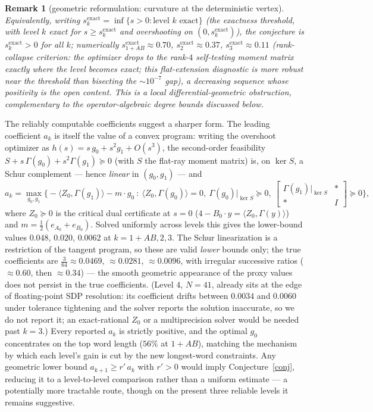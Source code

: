 \documentclass[11pt]{article}
\newtheorem{remark}[theorem]{Remark}
\begin{document}
\begin{remark}[geometric reformulation: curvature at the deterministic vertex]
Equivalently, writing
$s^{\mathrm{exact}}_k=\inf\{s>0:\text{level }k\text{ exact}\}$
(the exactness threshold, with level $k$ exact for
$s\ge s^{\mathrm{exact}}_k$ and overshooting on
$(0,s^{\mathrm{exact}}_k)$), the conjecture is $s^{\mathrm{exact}}_k>0$
for all $k$; numerically $s^{\mathrm{exact}}_{1+AB}\approx0.70$,
$s^{\mathrm{exact}}_2\approx0.37$, $s^{\mathrm{exact}}_3\approx0.11$
(rank-collapse criterion: the optimizer drops to the rank-$4$
self-testing moment matrix exactly where the level becomes exact; this
flat-extension diagnostic is more robust near the threshold than
bisecting the $\sim10^{-7}$ gap), a decreasing
sequence whose positivity is the open content. This is a local
differential-geometric obstruction, complementary to the operator-algebraic
degree bounds discussed below.
\end{remark}

The reliably computable coefficients suggest a sharper form. The leading
coefficient $a_k$ is itself the value of a convex program: writing the overshoot
optimizer as $h(s)=s\,g_0+s^2 g_1+O(s^3)$, the second-order feasibility
$S+s\,\Gamma(g_0)+s^2\Gamma(g_1)\succeq0$ (with $S$ the flat-ray moment matrix)
is, on $\ker S$, a Schur complement --- hence \emph{linear} in $(g_0,g_1)$ --- and
\[
  a_k=\max_{g_0,g_1}\Big\{-\langle Z_0,\Gamma(g_1)\rangle-m\!\cdot\!g_0\ :\
    \langle Z_0,\Gamma(g_0)\rangle=0,\ \Gamma(g_0)|_{\ker S}\succeq0,\
    \begin{bmatrix}\Gamma(g_1)|_{\ker S} & \ast\\ \ast & I\end{bmatrix}\succeq0\Big\},
\]
where $Z_0\succeq0$ is the critical dual certificate at $s=0$
($4-B_0\!\cdot\!y=\langle Z_0,\Gamma(y)\rangle$) and $m=\tfrac12(e_{A_0}+e_{B_0})$.
Solved uniformly
across levels this gives the lower-bound values $0.048$, $0.020$, $0.0062$ at
$k=1{+}AB,2,3$. The Schur linearization is a restriction of the tangent
program, so these are valid \emph{lower} bounds only; the true coefficients
are $\tfrac3{64}\approx0.0469$, $\approx0.0281$, $\approx0.0096$, with
irregular successive ratios ($\approx0.60$, then $\approx0.34$) --- the
smooth geometric appearance of the proxy values does not persist in the true
coefficients. (Level $4$, $N=41$, already sits at the edge of
floating-point SDP resolution: its coefficient drifts between $0.0034$ and
$0.0060$ under tolerance tightening and the solver reports the solution
inaccurate, so we do not report it; an exact-rational $Z_0$ or a multiprecision
solver would be needed past $k=3$.) Every reported $a_k$ is strictly positive,
and the optimal $g_0$ concentrates on the top word length ($56\%$ at $1{+}AB$),
matching the mechanism by which each level's gain is cut by the new
longest-word constraints. Any geometric lower bound $a_{k+1}\ge r'\,a_k$ with
$r'>0$ would imply Conjecture~\ref{conj}, reducing it to a level-to-level
comparison rather than a uniform estimate --- a potentially more tractable route,
though on the present three reliable levels it remains suggestive.
\end{document}
